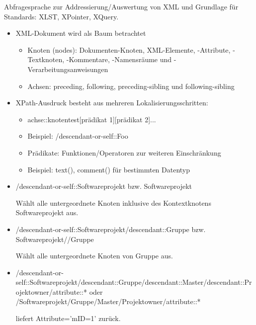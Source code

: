 Abfragesprache zur Addressierung/Auswertung von XML und Grundlage für Standards: XLST, XPointer, XQuery.
\begin{itemize} 
	
	\item XML-Dokument wird als Baum betrachtet
	\begin{itemize}
		\item Knoten (nodes): Dokumenten-Knoten, XML-Elemente, -Attribute, -Textknoten, -Kommentare, -Namensräume und -Verarbeitungsanweisungen
		\item Achsen: preceding, following, preceding-sibling und following-sibling	
	\end{itemize}

\end{itemize}

\begin{itemize} 
	
	\item XPath-Ausdruck besteht aus mehreren Lokalisierungsschritten:
	\begin{itemize}
		\item achse::knotentest[prädikat 1][prädikat 2]...
		\item Beispiel: /descendant-or-self::Foo
		\item Prädikate: Funktionen/Operatoren zur weiteren Einschränkung
		\item Beispiel: text(), comment() für bestimmten Datentyp	
	\end{itemize}

\end{itemize}
\nsecend
{}
\begin{itemize}
	\item /descendant-or-self::Softwareprojekt bzw. Softwareprojekt
	
	Wählt alle untergeordnete Knoten inklusive des Kontextknotens Softwareprojekt aus.
	
	\item /descendant-or-self::Softwareprojekt/descendant::Gruppe bzw. Softwareprojekt//Gruppe
	
	Wählt alle untergeordnete Knoten von Gruppe aus.
	
	\item /descendant-or-self::Softwareprojekt/descendant::Gruppe/descendant::Master/descendant::Projektowner/attribute::* oder /Softwareprojekt/Gruppe/Master/Projektowner/attribute::*
	
	liefert Attribute='mID=1' zurück.
	
\end{itemize}
\nsecend
\nsecend